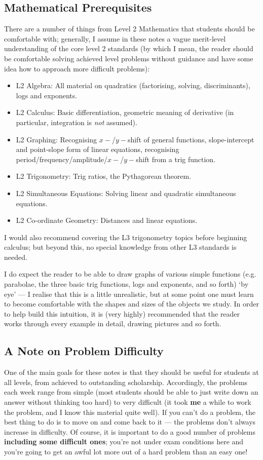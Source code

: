 \subsection*{Mathematical Prerequisites}
There are a number of things from Level 2 Mathematics that students should be
comfortable with; generally, I assume in these notes a vague merit-level understanding
of the core level 2 standards (by which I mean, the reader should be comfortable solving
achieved level problems without guidance and have some idea how to approach more difficult
problems):
\begin{itemize}
  \item L2 Algebra: All material on quadratics (factorising, solving, discriminants), logs and exponents.
  \item L2 Calculus: Basic differentiation, geometric meaning of derivative (in particular, integration is \textit{not} assumed).
  \item L2 Graphing: Recognising $ x-$/$ y-$shift of general functions, slope-intercept and point-slope form of linear equations,
                          recognising period/frequency/amplitude/$ x-$/$ y-$shift from a trig function.
  \item L2 Trigonometry: Trig ratios, the Pythagorean theorem.
  \item L2 Simultaneous Equations: Solving linear and quadratic simultaneous equations.
  \item L2 Co-ordinate Geometry: Distances and linear equations.
\end{itemize}

I would also recommend covering the L3 trigonometry topics before beginning calculus; but beyond this, no special knowledge
from other L3 standards is needed.

I do expect the reader to be able to draw graphs of various simple functions (e.g. parabolae, the three basic trig functions, logs and
exponents, and so forth) `by eye' --- I realise that this is a little unrealistic, but at some point one must learn to become comfortable
with the shapes and sizes of the objects we study. In order to help build this intuition, it is (very highly) recommended that the reader
works through every example in detail, drawing pictures and so forth.

\subsection*{A Note on Problem Difficulty}
One of the main goals for these notes is that they should be useful for students at all levels, from achieved to outstanding scholarship. Accordingly, the
problems each week range from simple (most students should be able to just write down an answer without thinking too hard) to
very difficult (it took \textbf{me} a while to work the problem, and I know this material quite well). If you can't do
a problem, the best thing to do is to move on and come back to it --- the problems don't always increase in difficulty. Of course,
it is important to do a good number of problems \textbf{including some difficult ones}; you're not under exam conditions here
and you're going to get an awful lot more out of a hard problem than an easy one!

